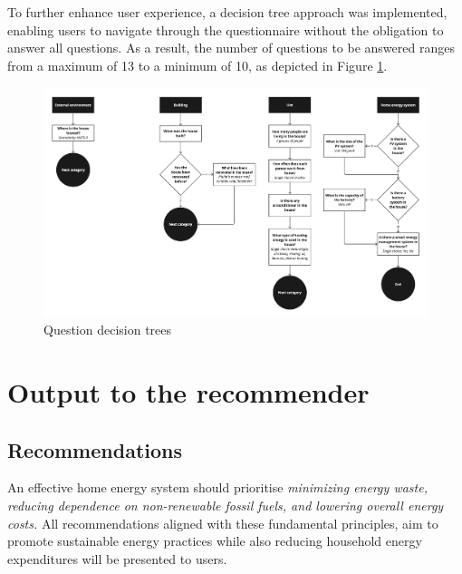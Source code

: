 To further enhance user experience, a decision tree approach was implemented, enabling users to navigate through the questionnaire without the obligation to answer all questions.
As a result, the number of questions to be answered ranges from a maximum of 13 to a minimum of 10, as depicted in Figure \ref{fig:trees}. 
\begin{figure}[h!]
  \centering
  \includegraphics[width=\textwidth]{Images/trees.jpg}
  \caption{Question decision trees}
  \label{fig:trees}
\end{figure}


\section{Output to the recommender}

\subsection{Recommendations}

An effective home energy system should prioritise 
\emph{minimizing energy waste, reducing dependence on non-renewable fossil fuels, and lowering overall energy costs. }
All recommendations aligned with these fundamental principles, 
aim to promote sustainable energy practices while also reducing household energy expenditures will be presented to users. 

